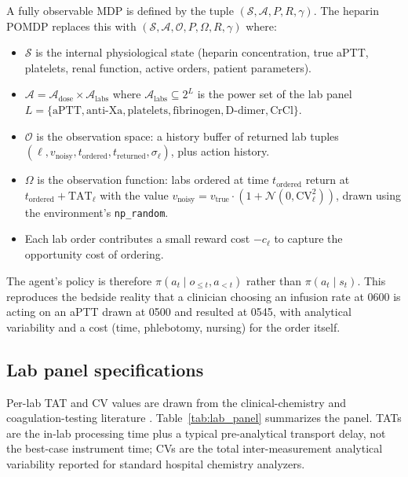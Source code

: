 \documentclass[11pt]{article}
\begin{document}
A fully observable MDP is defined by the tuple $(\mathcal{S}, \mathcal{A}, P, R, \gamma)$. The heparin POMDP replaces this with $(\mathcal{S}, \mathcal{A}, \mathcal{O}, P, \Omega, R, \gamma)$ where:
\begin{itemize}
  \item $\mathcal{S}$ is the internal physiological state (heparin concentration, true aPTT, platelets, renal function, active orders, patient parameters).
  \item $\mathcal{A} = \mathcal{A}_{\text{dose}} \times \mathcal{A}_{\text{labs}}$ where $\mathcal{A}_{\text{labs}} \subseteq 2^{L}$ is the power set of the lab panel $L = \{\text{aPTT}, \text{anti-Xa}, \text{platelets}, \text{fibrinogen}, \text{D-dimer}, \text{CrCl}\}$.
  \item $\mathcal{O}$ is the observation space: a history buffer of returned lab tuples $(\ell, v_{\text{noisy}}, t_{\text{ordered}}, t_{\text{returned}}, \sigma_\ell)$, plus action history.
  \item $\Omega$ is the observation function: labs ordered at time $t_{\text{ordered}}$ return at $t_{\text{ordered}} + \text{TAT}_\ell$ with the value $v_{\text{noisy}} = v_{\text{true}} \cdot (1 + \mathcal{N}(0, \text{CV}_\ell^2))$, drawn using the environment's \texttt{np\_random}.
  \item Each lab order contributes a small reward cost $-c_\ell$ to capture the opportunity cost of ordering.
\end{itemize}

The agent's policy is therefore $\pi(a_t \mid o_{\leq t}, a_{< t})$ rather than $\pi(a_t \mid s_t)$. This reproduces the bedside reality that a clinician choosing an infusion rate at 0600 is acting on an aPTT drawn at 0500 and resulted at 0545, with analytical variability and a cost (time, phlebotomy, nursing) for the order itself.

\subsection{Lab panel specifications}

Per-lab TAT and CV values are drawn from the clinical-chemistry and coagulation-testing literature \citep{bowen2016, lippi2012, whitehead2020, vandenbesselaar2010}. Table~\ref{tab:lab_panel} summarizes the panel. TATs are the in-lab processing time plus a typical pre-analytical transport delay, not the best-case instrument time; CVs are the total inter-measurement analytical variability reported for standard hospital chemistry analyzers.
\end{document}
